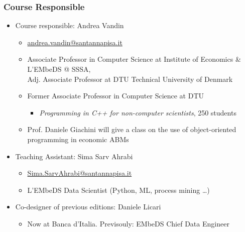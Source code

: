 \documentclass{beamer}%
\begin{document}
\begin{frame}
\frametitle{Course Responsible}
 \begin{itemize}
   \item Course responsible: Andrea Vandin
	\begin{itemize}
      \item\href{mailto:andrea.vandin@santannapisa.it}{\color{blue}andrea.vandin@santannapisa.it}
	  \item Associate Professor in Computer Science at Institute of Economics \& L'EMbeDS @ SSSA, \\ Adj. Associate Professor at DTU Technical University of Denmark
	  \item Former Associate Professor in Computer Science at DTU
	  \begin{itemize}
      \item 
	   {\scriptsize \emph{Programming in C++ for non-computer scientists}, 250 students}
	  \end{itemize}
	\item Prof. Daniele Giachini will give a class on the use of object-oriented programming in economic ABMs
    \end{itemize}
      \item Teaching Assistant: Sima Sarv Ahrabi
\begin{itemize}
	\item \href{mailto:Sima.SarvAhrabi@santannapisa.it}{\color{blue}Sima.SarvAhrabi@santannapisa.it}
	\item L'EMbeDS Data Scientist (Python,  ML, process mining \ldots)
\end{itemize}
      \item Co-designer of previous editions: Daniele Licari 
\begin{itemize}
	\item Now at Banca d'Italia. 
Previsouly: EMbeDS Chief Data Engineer
\end{itemize}
	\end{itemize}
\end{frame}
\end{document}

